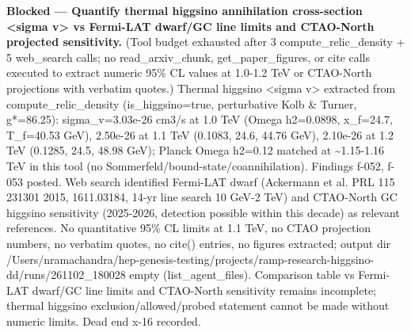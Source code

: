 \documentclass[11pt,a4paper]{article}
\begin{document}
\textbf{Blocked --- Quantify thermal higgsino annihilation cross-section \textless{}sigma v\textgreater{} vs Fermi-LAT dwarf/GC line limits and CTAO-North projected sensitivity.} (Tool budget exhausted after 3 compute\_relic\_density + 5 web\_search calls; no read\_arxiv\_chunk, get\_paper\_figures, or cite calls executed to extract numeric 95\% CL values at 1.0-1.2 TeV or CTAO-North projections with verbatim quotes.) Thermal higgsino \textless{}sigma v\textgreater{} extracted from compute\_relic\_density (is\_higgsino=true, perturbative Kolb \& Turner, g*=86.25): sigma\_v=3.03e-26 cm3/s at 1.0 TeV (Omega h2=0.0898, x\_f=24.7, T\_f=40.53 GeV), 2.50e-26 at 1.1 TeV (0.1083, 24.6, 44.76 GeV), 2.10e-26 at 1.2 TeV (0.1285, 24.5, 48.98 GeV); Planck Omega h2=0.12 matched at \textasciitilde{}1.15-1.16 TeV in this tool (no Sommerfeld/bound-state/coannihilation). Findings f-052, f-053 posted. Web search identified Fermi-LAT dwarf (Ackermann et al. PRL 115 231301 2015, 1611.03184, 14-yr line search 10 GeV-2 TeV) and CTAO-North GC higgsino sensitivity (2025-2026, detection possible within this decade) as relevant references. No quantitative 95\% CL limits at 1.1 TeV, no CTAO projection numbers, no verbatim quotes, no cite() entries, no figures extracted; output dir /Users/nramachandra/hep-genesis-testing/projects/ramp-research-higgsino-dd/runs/261102\_180028 empty (list\_agent\_files). Comparison table vs Fermi-LAT dwarf/GC line limits and CTAO-North sensitivity remains incomplete; thermal higgsino exclusion/allowed/probed statement cannot be made without numeric limits. Dead end x-16 recorded.
\end{document}
